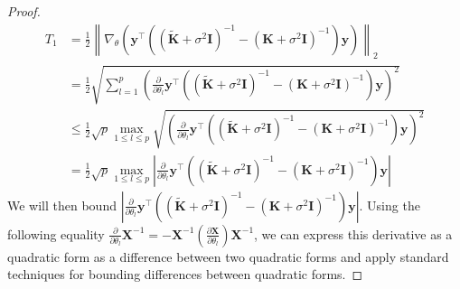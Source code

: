 \begin{proof}
\begin{align*}
    T_1 &= \frac{1}{2} \left\| \nabla_\theta \left( \mathbf{y}^\top \left( (\tilde{\mathbf{K}} + \sigma^2 \mathbf{I})^{-1} - (\mathbf{K} + \sigma^2 \mathbf{I})^{-1} \right) \mathbf{y} \right) \right\|_2\\
    &=\frac{1}{2}\sqrt{\sum_{l=1}^p \left(\frac{\partial}{\partial \theta_l}\mathbf{y}^\top \left( (\tilde{\mathbf{K}} + \sigma^2 \mathbf{I})^{-1} - (\mathbf{K} + \sigma^2 \mathbf{I})^{-1} \right) \mathbf{y}\right)^2}\\
    &\leq \frac{1}{2}\sqrt{p}\max_{1\leq l\leq p}\sqrt{\left(\frac{\partial}{\partial \theta_l}\mathbf{y}^\top \left( (\tilde{\mathbf{K}} + \sigma^2 \mathbf{I})^{-1} - (\mathbf{K} + \sigma^2 \mathbf{I})^{-1} \right) \mathbf{y}\right)^2}\\
    &=\frac{1}{2}\sqrt{p}\max_{1\leq l\leq p} \left\vert \frac{\partial}{\partial \theta_l}\mathbf{y}^\top \left( (\tilde{\mathbf{K}} + \sigma^2 \mathbf{I})^{-1} - (\mathbf{K} + \sigma^2 \mathbf{I})^{-1} \right) \mathbf{y}\right\vert
\end{align*}
We will then bound $\left\vert \frac{\partial}{\partial \theta_l}\mathbf{y}^\top \left( (\tilde{\mathbf{K}} + \sigma^2 \mathbf{I})^{-1} - (\mathbf{K} + \sigma^2 \mathbf{I})^{-1} \right) \mathbf{y}\right\vert$. Using the following equality $\frac{\partial}{\partial \theta_l} \mathbf{X}^{-1} = -\mathbf{X}^{-1} (\frac{\partial \mathbf{X}}{\partial \theta_l}) \mathbf{X}^{-1}$, we can express this derivative as a quadratic form as a difference between two quadratic forms and apply standard techniques for bounding differences between quadratic forms.


\end{proof}

